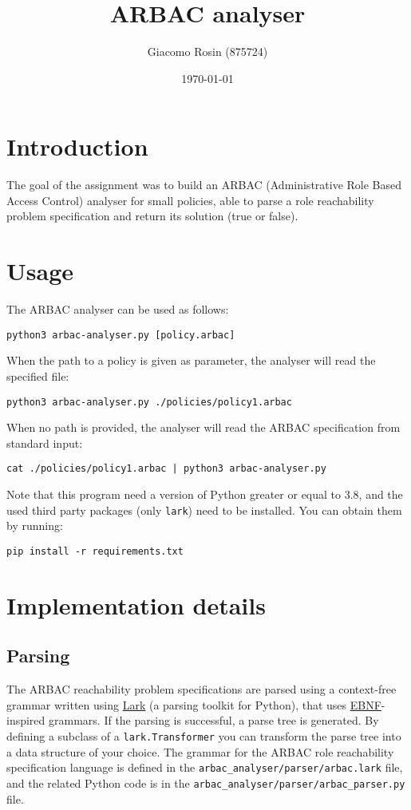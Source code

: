 \documentclass{article}
\title{ARBAC analyser}
\author{Giacomo Rosin (875724)}
\date{\today}
\begin{document}
\maketitle

\sloppy         %


\section{Introduction}
The goal of the assignment was to build an ARBAC (Administrative Role Based Access Control)
analyser for small policies, able to parse a role reachability problem specification and return
its solution (true or false).


\section{Usage}
The ARBAC analyser can be used as follows:
\begin{lstlisting}[]
 python3 arbac-analyser.py [policy.arbac]
\end{lstlisting}

\noindent
When the path to a policy is given as parameter, the analyser will read the specified file:
\begin{lstlisting}[]
 python3 arbac-analyser.py ./policies/policy1.arbac
\end{lstlisting}

\noindent
When no path is provided, the analyser will read the ARBAC specification from standard input:
\begin{lstlisting}[]
 cat ./policies/policy1.arbac | python3 arbac-analyser.py
\end{lstlisting}

\noindent
Note that this program need a version of Python greater or equal to 3.8, and the used
third party packages (only \lstinline[columns=fixed]{lark}) need to be installed.
You can obtain them by running:
\begin{lstlisting}[]
 pip install -r requirements.txt
\end{lstlisting}


\section{Implementation details}

\subsection{Parsing}
The ARBAC reachability problem specifications are parsed using a context-free grammar written
using \href{https://github.com/lark-parser/lark}{Lark} (a parsing toolkit for Python),
that uses \href{https://www.wikiwand.com/en/Extended_Backus-Naur_form}{EBNF}-inspired grammars.
If the parsing is successful, a parse tree is generated. By defining a subclass of a
\lstinline[columns=fixed]{lark.Transformer} you can transform the parse tree into a
data structure of your choice.
The grammar for the ARBAC role reachability specification language is defined in the
\lstinline[columns=fixed]{arbac_analyser/parser/arbac.lark} file, and the related
Python code is in the \lstinline[columns=fixed]{arbac_analyser/parser/arbac_parser.py} file.
\end{document}
